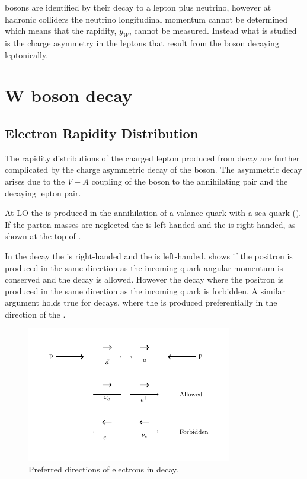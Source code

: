 \PW bosons are identified by their decay to a lepton plus neutrino, however at
hadronic colliders the neutrino longitudinal momentum cannot be determined
which means that the \PW rapidity, $y_{W}$, cannot be measured.  Instead what
is studied is the charge asymmetry in the leptons that result from the \PW boson
decaying leptonically.


\section{W boson decay}
\subsection{Electron Rapidity Distribution}
The rapidity distributions of the charged lepton produced from \PW decay are
further complicated by the charge asymmetric decay of the \PWpm boson. 
The asymmetric decay arises due to the $V-A$ coupling of the \PW boson to the
annihilating \HepProcess{\Pquark\APquark} pair and the decaying lepton pair.

At \ac{LO} the \PWp is produced in the annihilation of a \Pup valance quark
with a \APdown sea-quark (). 
If the parton masses are neglected the \Pup is left-handed and the \APdown is
right-handed, as shown at the top of . 

In the \PWp decay the \Ppositron is right-handed and the \Pnue is left-handed.
 shows if the  positron is produced in the same direction
as the incoming \APdown quark angular momentum is conserved and the decay is
allowed.
However the decay where the positron is produced in the same direction as the
incoming \Pup quark is forbidden.
A similar argument holds true for \PWm decays, where the \Pelectron is produced
preferentially in the direction of the \Pdown.

\begin{figure}[htbp]
  \centering
  \includegraphics[width=0.8\textwidth]{w_decay_directions}
  \caption{Preferred directions of electrons in 
    \HepProcess{\PWplus\to\APelectron\Pnue} decay.}
  \label{wbos:wspin}
\end{figure}

